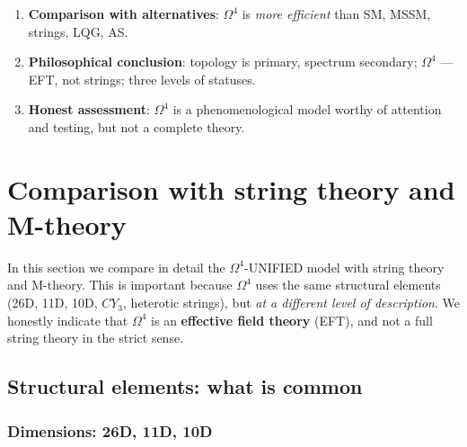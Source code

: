 \documentclass[11pt,a4paper]{article}
\newcommand{\CY}{\ensuremath{CY_3}}
\newcommand{\Om}{\ensuremath{\Omega^4}}
\theoremstyle{definition}
\begin{document}
\begin{enumerate}
\begin{itemize}
              \item Nuclear physics: formulas are chosen,
                    not derived from first principles (open).
          \end{itemize}
    \item \textbf{Comparison with alternatives}:
          $\Om$ is \emph{more efficient} than SM, MSSM, strings, LQG, AS.
    \item \textbf{Philosophical conclusion}: topology is primary,
          spectrum secondary; $\Om$ --- EFT, not strings;
          three levels of statuses.
    \item \textbf{Honest assessment}: $\Om$ is a phenomenological
          model worthy of attention and testing, but
          not a complete theory.
\end{enumerate}
\section{Comparison with string theory and M-theory}
\label{sec:string-comparison}

In this section we compare in detail the $\Om$-UNIFIED model
with string theory and M-theory. This is important because $\Om$
uses the same structural elements (26D, 11D, 10D, $\CY$,
heterotic strings), but \emph{at a different level of description}.
We honestly indicate that $\Om$ is an \textbf{effective
field theory} (EFT), and not a full string theory in the strict sense.

\subsection{Structural elements: what is common}
\label{subsec:string-common}

\subsubsection{Dimensions: 26D, 11D, 10D}
\end{document}
